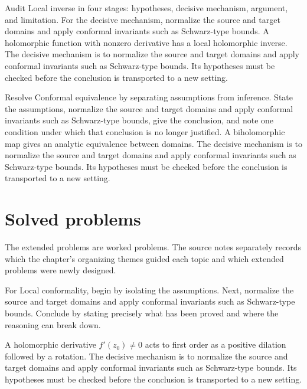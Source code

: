 \begin{example}\label{ex:iv17-worked-03}
Audit Local inverse in four stages: hypotheses, decisive mechanism, argument, and limitation. For the decisive mechanism, normalize the source and target domains and apply conformal invariants such as Schwarz-type bounds. A holomorphic function with nonzero derivative has a local holomorphic inverse. The decisive mechanism is to normalize the source and target domains and apply conformal invariants such as Schwarz-type bounds. Its hypotheses must be checked before the conclusion is transported to a new setting.
\end{example}

\begin{example}\label{ex:iv17-worked-04}
Resolve Conformal equivalence by separating assumptions from inference. State the assumptions, normalize the source and target domains and apply conformal invariants such as Schwarz-type bounds, give the conclusion, and note one condition under which that conclusion is no longer justified. A biholomorphic map gives an analytic equivalence between domains. The decisive mechanism is to normalize the source and target domains and apply conformal invariants such as Schwarz-type bounds. Its hypotheses must be checked before the conclusion is transported to a new setting.
\end{example}

\section{Solved problems}
The extended problems are worked problems. The source notes separately records which the chapter's organizing themes guided each topic and which extended problems were newly designed.

\begin{problem}\label{prob:iv17-problem-01}
For Local conformality, begin by isolating the assumptions. Next, normalize the source and target domains and apply conformal invariants such as Schwarz-type bounds. Conclude by stating precisely what has been proved and where the reasoning can break down.
\end{problem}
\begin{solution}
A holomorphic derivative $f'(z_0)\ne0$ acts to first order as a positive dilation followed by a rotation. The decisive mechanism is to normalize the source and target domains and apply conformal invariants such as Schwarz-type bounds. Its hypotheses must be checked before the conclusion is transported to a new setting.
\end{solution}

